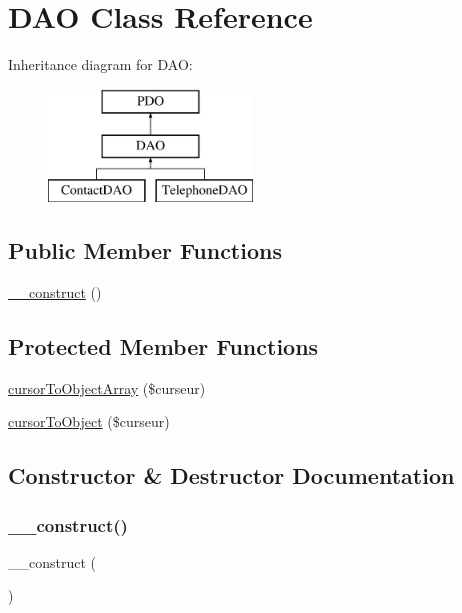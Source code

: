 \hypertarget{class_d_a_o}{}\section{D\+AO Class Reference}
\label{class_d_a_o}
Inheritance diagram for D\+AO\+:\begin{figure}[H]
\begin{center}
\leavevmode
\includegraphics[height=3.000000cm]{class_d_a_o}
\end{center}
\end{figure}
\subsection*{Public Member Functions}
\begin{DoxyCompactItemize}
\item 
\hyperlink{class_d_a_o_a095c5d389db211932136b53f25f39685}{\+\_\+\+\_\+construct} ()
\end{DoxyCompactItemize}
\subsection*{Protected Member Functions}
\begin{DoxyCompactItemize}
\item 
\hyperlink{class_d_a_o_a549647c3d73fee1b928cfe2c65885fe7}{cursor\+To\+Object\+Array} (\$curseur)
\item 
\hyperlink{class_d_a_o_a1d3992ba69ebcdf34a867e742fb62c14}{cursor\+To\+Object} (\$curseur)
\end{DoxyCompactItemize}


\subsection{Constructor \& Destructor Documentation}
\mbox{\label{class_d_a_o_a095c5d389db211932136b53f25f39685}} 
\subsubsection{\texorpdfstring{\+\_\+\+\_\+construct()}{\_\_construct()}}
{\footnotesize\ttfamily \+\_\+\+\_\+construct (\begin{DoxyParamCaption}{ }\end{DoxyParamCaption})}



